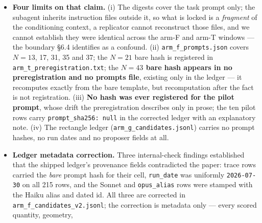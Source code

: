 \begin{itemize}
  as is its positive-control amendment (\texttt{15555eb}). Arm PP
  (\texttt{arm\_pp\_preregistration.txt}, prompt hashes and scorer committed, \texttt{2e89614},
  pushed before the first invocation) discloses that its paraphrases were authored results-aware.
  The rectangle transfer was registered before
  collection and never refitted. On multiplicity: this study now spans many registered arms, and no
  correction across arms is applied --- each arm's predictions were registered with its own
  bars and falsifiers before its sampling, every arm is reported regardless of outcome
  (three GM-chain instruments failed or stalled before one succeeded, and \S3.4's falsifier
  fired), and no arm was selected for inclusion on its result. The protection against
  garden-of-forking-paths here is registration and exhaustive reporting, not a family-wise
  error rate; a reader who wants one can count arms from this section.
\item \textbf{Four limits on that claim.} (i) The digests cover the task prompt only; the subagent
  inherits instruction files outside it, so what is locked is a \emph{fragment} of the conditioning
  context, a replicator cannot reconstruct those files, and we cannot establish they were
  identical across the arm-F and arm-T windows --- the boundary \S6.4 identifies as a confound.
  (ii) \texttt{arm\_f\_prompts.json} covers $N = 13$, 17, 31, 35 and 37; the $N = 21$ bare hash is registered
  in \texttt{arm\_t\_preregistration.txt}; the \textbf{$N = 43$ bare hash appears in no preregistration and no
  prompts file}, existing only in the ledger --- it recomputes exactly from the bare template, but
  recomputation after the fact is not registration. (iii) \textbf{No hash was ever registered for the
  pilot prompt}, whose drift the preregistration describes only in prose; the ten pilot rows
  carry \texttt{prompt\_sha256: null} in the corrected ledger with an explanatory note. (iv) The
  rectangle ledger (\texttt{arm\_g\_candidates.jsonl}) carries no prompt hashes, no run dates and no
  proposer fields at all.
\item \textbf{Ledger metadata correction.} Three internal-check findings established that the shipped ledger's
  provenance fields contradicted the paper: trace rows carried the \emph{bare} prompt hash for their
  cell, \texttt{run\_date} was uniformly \texttt{2026-07-30} on all 215 rows, and the Sonnet and \texttt{opus\_alias}
  rows were stamped with the Haiku alias and dated id. All three are corrected in
  \texttt{arm\_f\_candidates\_v2.jsonl}; the correction is metadata only --- every scored quantity, geometry,

\end{itemize}
